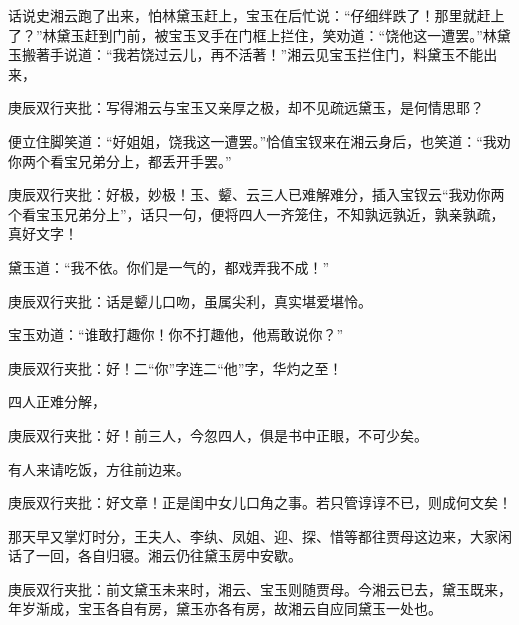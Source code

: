 \begin{parag}

    话说史湘云跑了出来，怕林黛玉赶上，宝玉在后忙说：“仔细绊跌了！那里就赶上了？”林黛玉赶到门前，被宝玉叉手在门框上拦住，笑劝道：“饶他这一遭罢。”林黛玉搬著手说道：“我若饶过云儿，再不活著！”湘云见宝玉拦住门，料黛玉不能出来，\begin{note}庚辰双行夹批：写得湘云与宝玉又亲厚之极，却不见疏远黛玉，是何情思耶？\end{note}便立住脚笑道：“好姐姐，饶我这一遭罢。”恰值宝钗来在湘云身后，也笑道：“我劝你两个看宝兄弟分上，都丢开手罢。”\begin{note}庚辰双行夹批：好极，妙极！玉、颦、云三人已难解难分，插入宝钗云“我劝你两个看宝玉兄弟分上”，话只一句，便将四人一齐笼住，不知孰远孰近，孰亲孰疏，真好文字！\end{note}黛玉道：“我不依。你们是一气的，都戏弄我不成！”\begin{note}庚辰双行夹批：话是颦儿口吻，虽属尖利，真实堪爱堪怜。\end{note}宝玉劝道：“谁敢打趣你！你不打趣他，他焉敢说你？”\begin{note}庚辰双行夹批：好！二“你”字连二“他”字，华灼之至！\end{note}四人正难分解，\begin{note}庚辰双行夹批：好！前三人，今忽四人，俱是书中正眼，不可少矣。\end{note}有人来请吃饭，方往前边来。\begin{note}庚辰双行夹批：好文章！正是闺中女儿口角之事。若只管谆谆不已，则成何文矣！\end{note}
\end{parag}


\begin{parag}


    那天早又掌灯时分，王夫人、李纨、凤姐、迎、探、惜等都往贾母这边来，大家闲话了一回，各自归寝。湘云仍往黛玉房中安歇。\begin{note}庚辰双行夹批：前文黛玉未来时，湘云、宝玉则随贾母。今湘云已去，黛玉既来，年岁渐成，宝玉各自有房，黛玉亦各有房，故湘云自应同黛玉一处也。\end{note}
\end{parag}


